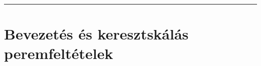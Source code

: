 \documentclass[11pt,a4paper]{article}
\begin{document}
\begin{abstract}
kimutatjuk a poszt-inflációs kompozit axionok (\textbf{Solution A2}) $P_{\mathrm{spin}\text{-}M} = (-1)^{3(B-L)+2s}$ barion-relikvia korlátját. (3) Megkonstruáljuk az egyetlen ultraibolya axionmentes alternatívát (\textbf{Solution B}): a csúcspólus-mentes moduláris $\mathcal{N}=1$ szupergravitációs $\mathrm{Spin}(10)\oplus\mathbf{120}_H$ modellt ($k_{16}=(+6,0,-6)$, $k_H=+3$, Green--Schwarz $S$), amely szigorúan $\mathcal{F}$ belsejében ($\tau_0 = +0.02934 + 1.37758i$, $\arg\det(Y_u Y_d)=0$, $|\varepsilon_1| = 4.18\times 10^{-6}$) visszaadja mind a 13 egy-Higgs SM-sivatag íz-megfigyelhetőt négy szigorú $M_R$ feletti UV-feltétel árán, éles kísérleti szétválasztást adva a MADMAX/BREAD, LiteBIRD és CMB-S4 mérésekre.
\end{abstract}

\tableofcontents
\vspace{0.4em}
\hrule
\vspace{0.8em}

\section{Bevezetés és keresztskálás peremfeltételek}
\end{document}

